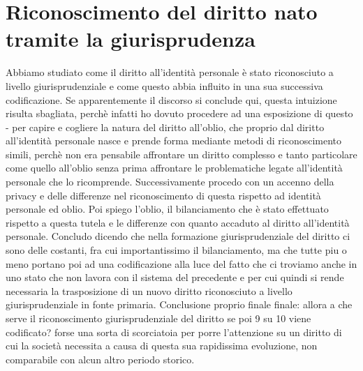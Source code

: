 \section{Riconoscimento del diritto nato tramite la giurisprudenza}
Abbiamo studiato come il diritto all'identità personale è stato riconosciuto a livello giurisprudenziale e come questo abbia influito in una sua successiva codificazione. Se apparentemente il discorso si conclude qui, questa intuizione risulta sbagliata, perchè infatti ho dovuto procedere ad una esposizione di questo - per capire e cogliere la natura del diritto all'oblio, che proprio dal diritto all'identità personale nasce e prende forma mediante metodi di riconoscimento simili, perchè non era pensabile affrontare un diritto complesso e tanto particolare come quello all'oblio senza prima affrontare le problematiche legate all'identità personale che lo ricomprende.
Successivamente procedo con un accenno della privacy e delle differenze nel riconoscimento di questa rispetto ad identità personale ed oblio.
Poi spiego l'oblio, il bilanciamento che è stato effettuato rispetto a questa tutela e le differenze con quanto accaduto al diritto all'identità personale.
Concludo dicendo che nella formazione giurisprudenziale del diritto ci sono delle costanti, fra cui importantissimo il bilanciamento, ma che tutte piu o meno portano poi ad una codificazione alla  luce del fatto che ci troviamo anche in uno stato che non lavora con il sistema del precedente e per cui quindi si rende necessaria la trasposizione di un nuovo diritto riconosciuto a livello giurisprudenziale in fonte primaria.
Conclusione proprio finale finale: allora a che serve il riconoscimento giurisprudenziale del diritto se poi 9 su 10 viene codificato? forse una sorta di scorciatoia per porre l'attenzione su un diritto di cui  la società necessita a causa di questa sua rapidissima evoluzione, non  comparabile con alcun altro periodo storico.
